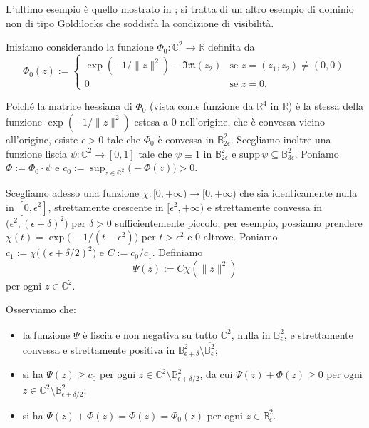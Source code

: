 L'ultimo esempio è quello mostrato in \cite[Section 5.2]{CMS}; si tratta di un altro esempio di dominio non di tipo Goldilocks che soddisfa la condizione di visibilità.

Iniziamo considerando la funzione $\Phi_0:\mathbb{C}^2\longrightarrow\mathbb{R}$ definita da
$$\Phi_0(z):=\begin{cases}
    \exp(-1/\|z\|^2)-\mathfrak{Im}(z_2) &\mbox{se }z=(z_1,z_2)\not=(0,0)\\
    0 &\mbox{se }z=0.
\end{cases}$$

Poiché la matrice hessiana di $\Phi_0$ (vista come funzione da $\mathbb{R}^4$ in $\mathbb{R}$) è la stessa della funzione $\exp(-1/\|z\|^2)$ estesa a $0$ nell'origine, che è convessa vicino all'origine, esiste $\epsilon>0$ tale che $\Phi_0$ è convessa in $\mathbb{B}^2_{2\epsilon}$. Scegliamo inoltre una funzione liscia $\psi:\mathbb{C}^2\longrightarrow[0,1]$ tale che $\psi\equiv 1$ in $\mathbb{B}^2_{2\epsilon}$ e $\text{supp}\,{\psi}\subseteq \mathbb{B}^2_{3\epsilon}$. Poniamo $\Phi:=\Phi_0\cdot\psi$ e $c_0:=\displaystyle\sup_{z\in\mathbb{C}^2}\big(-\Phi(z)\big)>0$.

Scegliamo adesso una funzione $\chi:[0,+\infty)\longrightarrow[0,+\infty)$ che sia identicamente nulla in $[0,\epsilon^2]$, strettamente crescente in $[\epsilon^2,+\infty)$ e strettamente convessa in $\big(\epsilon^2,(\epsilon+\delta)^2\big)$ per $\delta>0$ sufficientemente piccolo; per esempio, possiamo prendere $\chi(t)=\exp\big(-1/(t-\epsilon^2)\big)$ per $t>\epsilon^2$ e $0$ altrove. Poniamo $c_1:=\chi\big((\epsilon+\delta/2)^2\big)$ e $C:=c_0/c_1$. Definiamo
$$\Psi(z):=C\chi(\|z\|^2)$$
per ogni $z\in\mathbb{C}^2$.

Osserviamo che:
\begin{itemize}
    \item la funzione $\Psi$ è liscia e non negativa su tutto $\mathbb{C}^2$, nulla in $\overline{\mathbb{B}^2_\epsilon}$, e strettamente convessa e strettamente positiva in $\mathbb{B}^2_{\epsilon+\delta}\setminus\overline{\mathbb{B}^2_\epsilon}$;
    \item si ha $\Psi(z)\ge c_0$ per ogni $z\in\mathbb{C}^2\setminus\mathbb{B}^2_{\epsilon+\delta/2}$, da cui $\Psi(z)+\Phi(z)\ge 0$ per ogni $z\in\mathbb{C}^2\setminus\mathbb{B}^2_{\epsilon+\delta/2}$;
    \item si ha $\Psi(z)+\Phi(z)=\Phi(z)=\Phi_0(z)$ per ogni $z\in\mathbb{B}^2_\epsilon$.
\end{itemize}

